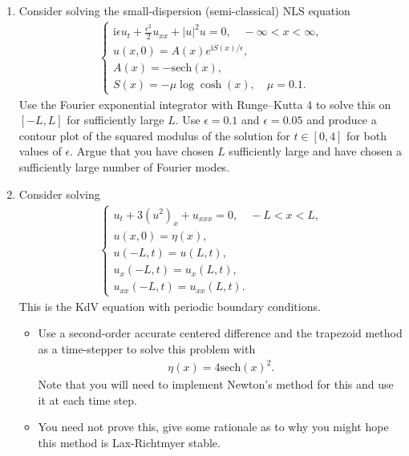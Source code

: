\documentclass[10pt]{amsart}
\newcommand{\I}{\text{i}}
\begin{document}
\begin{enumerate}[label={\bf Problem~{\arabic*}:}]
    \item Consider solving the small-dispersion (semi-classical) NLS equation
  \begin{align*}
    \begin{cases}
      \I \epsilon u_t + \frac{\epsilon^2}{2} u_{xx} + |u|^2 u = 0, \quad -\infty < x < \infty,\\
      u(x,0) = A(x) e^{\I S(x)/\epsilon},\\
      A(x) = - \mathrm{sech}(x),\\
      S(x) = - \mu \log \cosh (x), \quad \mu = 0.1.
    \end{cases}
    \end{align*}
        Use the Fourier exponential integrator with Runge--Kutta 4 to solve this on $[-L, L]$ for sufficiently large $L$.  Use $\epsilon = 0.1$ and $\epsilon = 0.05$ and produce a contour plot of the squared modulus of the solution for $t \in [0,4]$ for both values of $\epsilon$.  Argue that you have chosen $L$ sufficiently large and have chosen a sufficiently large number of Fourier modes.

        \mline 

\item Consider solving
  \begin{align*}
    \begin{cases} u_t + 3 (u^2)_x + u_{xxx} = 0, \quad -L < x < L,\\
      u(x,0) = \eta(x),\\
      u(-L,t) = u(L,t),\\
      u_x(-L,t) = u_x(L,t),\\
      u_{xx}(-L,t) = u_{xx}(L,t).\end{cases}
    \end{align*}
    This is the KdV equation with periodic boundary conditions.
    \begin{itemize}
    \item Use a second-order accurate centered difference and the trapezoid method as a time-stepper to solve this problem with
      \begin{align*}
        \eta(x) = 4 \mathrm{sech}(x)^2.
      \end{align*}
      Note that you will need to implement Newton's method for this and use it at each time step.
    \item You need not prove this, give some rationale as to why you might hope this method is Lax-Richtmyer stable.  
    \end{itemize}
    \mline


\end{enumerate}
\end{document}
